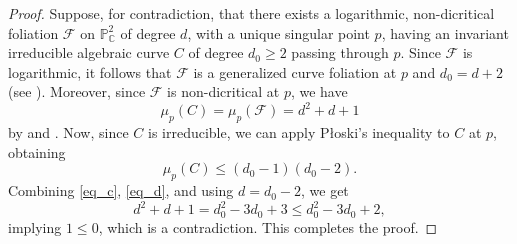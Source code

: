 \documentclass[11pt]{amsart}
\newcommand{\C}{\mathbb{C}}
\newcommand{\F}{\mathcal{F}}
\begin{document}
\begin{proof}
Suppose, for contradiction, that there exists a logarithmic, non-dicritical foliation $\F$ on $\mathbb{P}^2_\C$ of degree $d$, with a unique singular point $p$, having an invariant irreducible algebraic curve $C$ of degree $d_0\geq 2$ passing through $p$.
Since $\F$ is logarithmic, it follows that $\F$ is a generalized curve foliation at $p$ and $d_0=d+2$ (see \cite[Section 6]{FP-M}). Moreover, since $\F$ is non-dicritical at $p$, we have
\begin{equation}\label{eq_c}
\mu_p(C)=\mu_p(\F)=d^2+d+1
\end{equation}
 by \cite[Theorem 4]{CLS} and \cite[p. 19]{Brunella-book}. Now, since $C$ is irreducible, we can apply  P\l oski's inequality \cite[Lemma 2.2]{Ploski} to $C$ at $p$, obtaining
 \begin{equation}\label{eq_d}
 \mu_p(C)\leq (d_0-1)(d_0-2).
 \end{equation}
 Combining \eqref{eq_c}, \eqref{eq_d}, and using $d=d_0-2$, we get
 \[d^2+d+1=d_0^2-3d_0+3\leq d_0^2-3d_0+2,\]
 implying $1\leq 0$, which is a contradiction. This completes the proof.
\end{proof}
\end{document}
